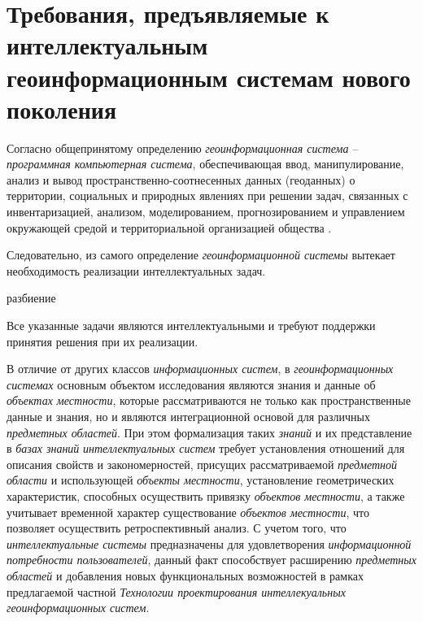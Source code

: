 \begin{SCn}
\end{SCn}

\section{Требования, предъявляемые к интеллектуальным геоинформационным системам нового поколения}
\label{chapter_gis_sec_requirements}

Согласно общепринятому определению \textit{геоинформационная система} -- \textit{программная компьютерная система}, обеспечивающая ввод, манипулирование, анализ и вывод пространственно-соотнесенных данных (геоданных) о территории, социальных и природных явлениях при решении задач, связанных с инвентаризацией, анализом, моделированием, прогнозированием и управлением окружающей средой и территориальной организацией общества .

Следовательно, из самого определение \textit{геоинформационной системы} вытекает необходимость реализации интеллектуальных задач.

\begin{SCn}
	
\begin{scnrelfromset}{разбиение}
\end{scnrelfromset}
	
\end{SCn}

Все указанные задачи являются интеллектуальными и требуют поддержки принятия решения при их реализации.

В отличие от других классов \textit{информационных систем}, в \textit{геоинформационных системах} основным объектом исследования являются знания и данные об \textit{объектах местности}, которые рассматриваются не только как пространственные данные и знания, но и являются интеграционной основой для различных \textit{предметных областей}. При этом формализация таких \textit{знаний} и их представление в \textit{базах знаний} \textit{интеллектуальных систем} требует установления отношений для описания свойств и закономерностей, присущих рассматриваемой \textit{предметной области} и использующей \textit{объекты местности}, установление геометрических характеристик, способных осуществить привязку \textit{объектов местности}, а также учитывает временной характер существование \textit{объектов местности}, что позволяет осуществить ретроспективный анализ. С учетом того, что \textit{интеллектуальные системы} предназначены для удовлетворения \textit{информационной потребности пользователей}, данный факт способствует расширению \textit{предметных областей} и добавления новых функциональных возможностей в рамках предлагаемой частной \textit{Технологии проектирования интеллекуальных геоинформационных систем}.

